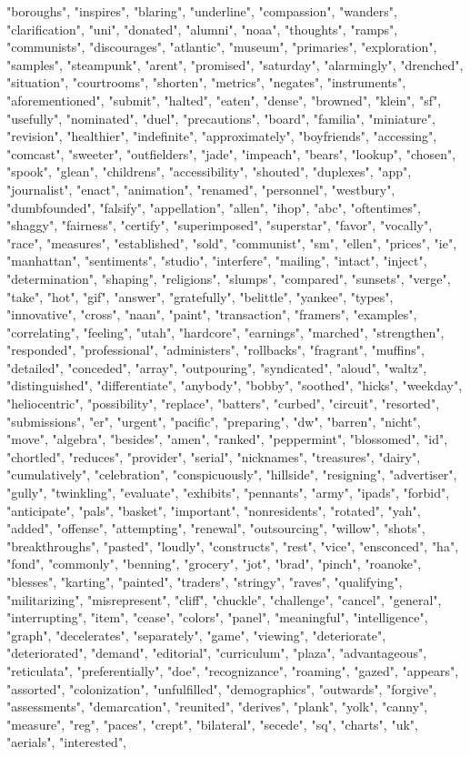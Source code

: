 "boroughs", "inspires", "blaring", "underline", "compassion", "wanders", "clarification", "uni", "donated", "alumni", "noaa", "thoughts", "ramps", "communists", "discourages", "atlantic", "museum", "primaries", "exploration", "samples", "steampunk", "arent", "promised", "saturday", "alarmingly", "drenched", "situation", "courtrooms", "shorten", "metrics", "negates", "instruments", "aforementioned", "submit", "halted", "eaten", "dense", "browned", "klein", "sf", "usefully", "nominated", "duel", "precautions", "board", "familia", "miniature", "revision", "healthier", "indefinite", "approximately", "boyfriends", "accessing", "comcast", "sweeter", "outfielders", "jade", "impeach", "bears", "lookup", "chosen", "spook", "glean", "childrens", "accessibility", "shouted", "duplexes", "app", "journalist", "enact", "animation", "renamed", "personnel", "westbury", "dumbfounded", "falsify", "appellation", "allen", "ihop", "abc", "oftentimes", "shaggy", "fairness", "certify", "superimposed", "superstar", "favor", "vocally", "race", "measures", "established", "sold", "communist", "sm", "ellen", "prices", "ie", "manhattan", "sentiments", "studio", "interfere", "mailing", "intact", "inject", "determination", "shaping", "religions", "slumps", "compared", "sunsets", "verge", "take", "hot", "gif", "answer", "gratefully", "belittle", "yankee", "types", "innovative", "cross", "naan", "paint", "transaction", "framers", "examples", "correlating", "feeling", "utah", "hardcore", "earnings", "marched", "strengthen", "responded", "professional", "administers", "rollbacks", "fragrant", "muffins", "detailed", "conceded", "array", "outpouring", "syndicated", "aloud", "waltz", "distinguished", "differentiate", "anybody", "bobby", "soothed", "hicks", "weekday", "heliocentric", "possibility", "replace", "batters", "curbed", "circuit", "resorted", "submissions", "er", "urgent", "pacific", "preparing", "dw", "barren", "nicht", "move", "algebra", "besides", "amen", "ranked", "peppermint", "blossomed", "id", "chortled", "reduces", "provider", "serial", "nicknames", "treasures", "dairy", "cumulatively", "celebration", "conspicuously", "hillside", "resigning", "advertiser", "gully", "twinkling", "evaluate", "exhibits", "pennants", "army", "ipads", "forbid", "anticipate", "pals", "basket", "important", "nonresidents", "rotated", "yah", "added", "offense", "attempting", "renewal", "outsourcing", "willow", "shots", "breakthroughs", "pasted", "loudly", "constructs", "rest", "vice", "ensconced", "ha", "fond", "commonly", "benning", "grocery", "jot", "brad", "pinch", "roanoke", "blesses", "karting", "painted", "traders", "stringy", "raves", "qualifying", "militarizing", "misrepresent", "cliff", "chuckle", "challenge", "cancel", "general", "interrupting", "item", "cease", "colors", "panel", "meaningful", "intelligence", "graph", "decelerates", "separately", "game", "viewing", "deteriorate", "deteriorated", "demand", "editorial", "curriculum", "plaza", "advantageous", "reticulata", "preferentially", "doe", "recognizance", "roaming", "gazed", "appears", "assorted", "colonization", "unfulfilled", "demographics", "outwards", "forgive", "assessments", "demarcation", "reunited", "derives", "plank", "yolk", "canny", "measure", "reg", "paces", "crept", "bilateral", "secede", "sq", "charts", "uk", "aerials", "interested", 